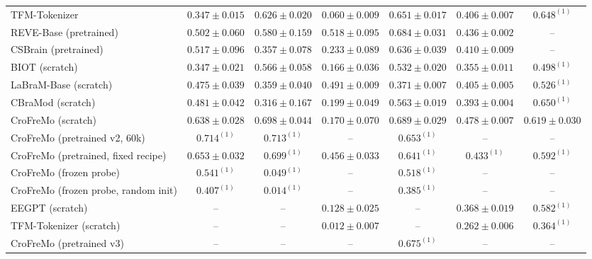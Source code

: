 \begin{table}[h]
\begin{tabular}{lcccccc}
TFM-Tokenizer & $0.347 \pm 0.015$ & $0.626 \pm 0.020$ & $0.060 \pm 0.009$ & $0.651 \pm 0.017$ & $0.406 \pm 0.007$ & $0.648^{(1)}$ \\
REVE-Base (pretrained) & $0.502 \pm 0.060$ & $0.580 \pm 0.159$ & $0.518 \pm 0.095$ & $0.684 \pm 0.031$ & $0.436 \pm 0.002$ & -- \\
CSBrain (pretrained) & $0.517 \pm 0.096$ & $0.357 \pm 0.078$ & $0.233 \pm 0.089$ & $0.636 \pm 0.039$ & $0.410 \pm 0.009$ & -- \\
BIOT (scratch) & $0.347 \pm 0.021$ & $0.566 \pm 0.058$ & $0.166 \pm 0.036$ & $0.532 \pm 0.020$ & $0.355 \pm 0.011$ & $0.498^{(1)}$ \\
LaBraM-Base (scratch) & $0.475 \pm 0.039$ & $0.359 \pm 0.040$ & $0.491 \pm 0.009$ & $0.371 \pm 0.007$ & $0.405 \pm 0.005$ & $0.526^{(1)}$ \\
CBraMod (scratch) & $0.481 \pm 0.042$ & $0.316 \pm 0.167$ & $0.199 \pm 0.049$ & $0.563 \pm 0.019$ & $0.393 \pm 0.004$ & $0.650^{(1)}$ \\
CroFreMo (scratch) & $0.638 \pm 0.028$ & $0.698 \pm 0.044$ & $0.170 \pm 0.070$ & $0.689 \pm 0.029$ & $0.478 \pm 0.007$ & $0.619 \pm 0.030$ \\
CroFreMo (pretrained v2, 60k) & $0.714^{(1)}$ & $0.713^{(1)}$ & -- & $0.653^{(1)}$ & -- & -- \\
CroFreMo (pretrained, fixed recipe) & $0.653 \pm 0.032$ & $0.699^{(1)}$ & $0.456 \pm 0.033$ & $0.641^{(1)}$ & $0.433^{(1)}$ & $0.592^{(1)}$ \\
CroFreMo (frozen probe) & $0.541^{(1)}$ & $0.049^{(1)}$ & -- & $0.518^{(1)}$ & -- & -- \\
CroFreMo (frozen probe, random init) & $0.407^{(1)}$ & $0.014^{(1)}$ & -- & $0.385^{(1)}$ & -- & -- \\
EEGPT (scratch) & -- & -- & $0.128 \pm 0.025$ & -- & $0.368 \pm 0.019$ & $0.582^{(1)}$ \\
TFM-Tokenizer (scratch) & -- & -- & $0.012 \pm 0.007$ & -- & $0.262 \pm 0.006$ & $0.364^{(1)}$ \\
CroFreMo (pretrained v3) & -- & -- & -- & $0.675^{(1)}$ & -- & -- \\
\bottomrule
\end{tabular}
\end{table}

